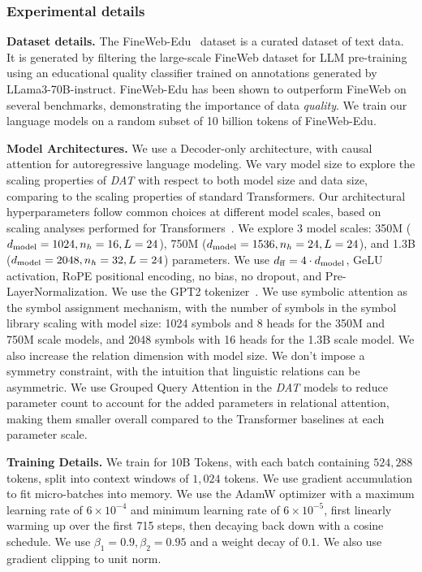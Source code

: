 \subsubsection*{Experimental details}

\textbf{Dataset details.} The FineWeb-Edu~\citep{lozhkov2024fineweb-edu} dataset is a curated dataset of text data. It is generated by filtering the large-scale FineWeb dataset for LLM pre-training~\citep{penedo2024finewebdatasetsdecantingweb} using an educational quality classifier trained on annotations generated by LLama3-70B-instruct. FineWeb-Edu has been shown to outperform FineWeb on several benchmarks, demonstrating the importance of data \textit{quality}. We train our language models on a random subset of 10 billion tokens of FineWeb-Edu.

\textbf{Model Architectures.} We use a Decoder-only architecture, with causal attention for autoregressive language modeling. We vary model size to explore the scaling properties of \textit{DAT} with respect to both model size and data size, comparing to the scaling properties of standard Transformers. Our architectural hyperparameters follow common choices at different model scales, based on scaling analyses performed for Transformers~\citep{penedo2024finewebdatasetsdecantingweb}. We explore 3 model scales: 350M ($d_{\mathrm{model}} = 1024, n_h = 16, L = 24$), 750M ($d_{\mathrm{model}} = 1536, n_h = 24, L = 24$), and 1.3B ($d_{\mathrm{model}} = 2048, n_h = 32, L = 24$) parameters. We use $d_{\mathrm{ff}} = 4 \cdot d_{\mathrm{model}}$, GeLU activation, RoPE positional encoding, no bias, no dropout, and Pre-LayerNormalization. We use the GPT2 tokenizer~\citep{radford2019language}. We use symbolic attention as the symbol assignment mechanism, with the number of symbols in the symbol library scaling with model size: 1024 symbols and 8 heads for the 350M and 750M scale models, and 2048 symbols with 16 heads for the 1.3B scale model. We also increase the relation dimension with model size. We don't impose a symmetry constraint, with the intuition that linguistic relations can be asymmetric. We use Grouped Query Attention in the \textit{DAT} models to reduce parameter count to account for the added parameters in relational attention, making them smaller overall compared to the Transformer baselines at each parameter scale.

\textbf{Training Details.} We train for 10B Tokens, with each batch containing $524,288$ tokens, split into context windows of $1,024$ tokens. We use gradient accumulation to fit micro-batches into memory. We use the AdamW optimizer with a maximum learning rate of $6 \times 10^{-4}$ and minimum learning rate of $6 \times 10^{-5}$, first linearly warming up over the first 715 steps, then decaying back down with a cosine schedule. We use $\beta_1 = 0.9, \beta_2 = 0.95$ and a weight decay of $0.1$. We also use gradient clipping to unit norm.


